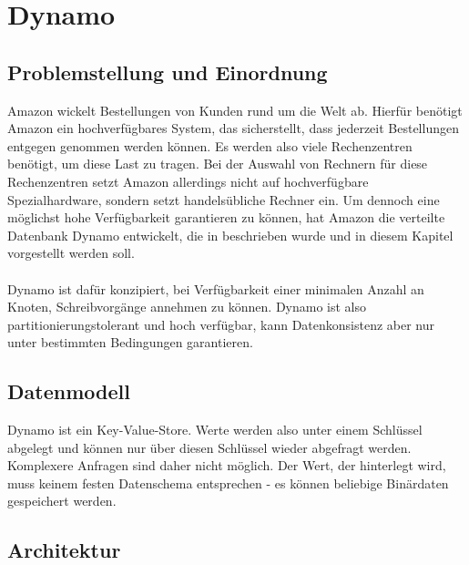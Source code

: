 \chapter{Dynamo}
\label{Dynamo}


\section{Problemstellung und Einordnung}
Amazon wickelt Bestellungen von Kunden rund um die Welt ab. Hierfür benötigt Amazon ein hochverfügbares System, das sicherstellt, dass jederzeit Bestellungen entgegen genommen werden können. Es werden also viele Rechenzentren benötigt, um diese Last zu tragen. Bei der Auswahl von Rechnern für diese Rechenzentren setzt Amazon allerdings nicht auf hochverfügbare Spezialhardware, sondern setzt handelsübliche Rechner ein. Um dennoch eine möglichst hohe Verfügbarkeit garantieren zu können, hat Amazon die verteilte Datenbank Dynamo entwickelt, die in \cite{dynamo} beschrieben wurde und in diesem Kapitel vorgestellt werden soll. \\ 
\\
Dynamo ist dafür konzipiert, bei Verfügbarkeit einer minimalen Anzahl an Knoten, Schreibvorgänge annehmen zu können. Dynamo ist also partitionierungstolerant und hoch verfügbar, kann Datenkonsistenz aber nur unter bestimmten Bedingungen garantieren. 
\section{Datenmodell}
Dynamo ist ein Key-Value-Store. Werte werden also unter einem Schlüssel abgelegt und können nur über diesen Schlüssel wieder abgefragt werden. Komplexere Anfragen sind daher nicht möglich. Der Wert, der hinterlegt wird, muss keinem festen Datenschema entsprechen - es können beliebige Binärdaten gespeichert werden.

\section{Architektur}

